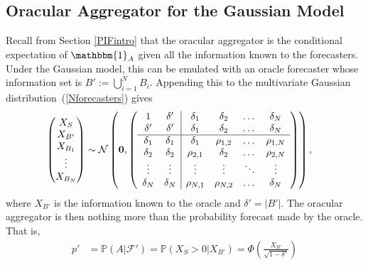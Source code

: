 \documentclass[12pt]{article}
\renewcommand{\P}{\mathbb{P}}
\theoremstyle{definition}
\theoremstyle{definition}
\def\one{\mathbbm{1}}
\def\P{{\mathbb P}}
\begin{document}
\subsection{Oracular Aggregator for the Gaussian Model}
\label{oracular}
Recall from Section \ref{PIFintro} that the oracular aggregator is the
conditional expectation of $\one_A$ given all the information known to the
forecasters. Under the Gaussian model, this can be
emulated with an oracle forecaster whose information set is
$B' := \bigcup_{i=1}^N B_i$.  Appending this to the multivariate
Gaussian distribution~(\ref{Nforecasters}) gives
\begin{align}
\left(\begin{matrix} X_S \\ X_{B'} \\ X_{B_1}\\ \vdots \\ X_{B_N} 
 \end{matrix}\right) &\sim \mathcal{N}\left( 
 \boldsymbol{0}, 
% 
 \left(\begin{array}{c c| c c cc }
1 & \delta' & \delta_1 & \delta_2 & \dots & \delta_N  \\ 
\delta' & \delta' & \delta_1 & \delta_2 & \dots & \delta_N  \\ \hline
\delta_1& \delta_1 & \delta_1 &\rho_{1,2} & \dots & \rho_{1,N}   \\ 
\delta_2 & \delta_2 &\rho_{2,1} & \delta_2 & \dots & \rho_{2,N}  \\ 
\vdots &\vdots & \vdots & \vdots & \ddots & \vdots  \\ 
\delta_N &\delta_N & \rho_{N,1} & \rho_{N,2} & \dots & \delta_N\\ 
 \end{array}\right)\right), \label{oracleN}
\end{align}
where $X_{B'}$ is the information known to the oracle and $\delta' =
|B'|$. The oracular aggregator is then nothing more than the probability forecast made by the oracle. That is,
 \begin{align*}
p' &= \P(A |  \mathcal{F}') = \P(X_S > 0 |  X_{B'}) = \Phi\left( \frac{X_{B'}}{\sqrt{1-\delta'}} \right)
\end{align*}
\end{document}
